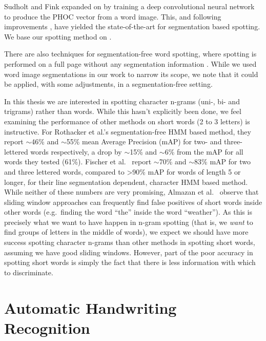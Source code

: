 \documentclass[ms,electronic,twosidetoc,letterpaper,chaptercenter,parttop,lof,lot]{byumsphd}
\begin{document}
Sudholt and Fink \cite{sudholt2016,sudholt2017} expanded on \cite{Almazan2014} by training a deep convolutional neural network to produce the PHOC vector from a word image. This, and following improvements \cite{krishnan2016, retsinasTrans2017}, have yielded the state-of-the-art for segmentation based spotting. We base our spotting method on \cite{sudholt2017}.

There are also techniques for segmentation-free word spotting, where spotting is performed on a full page without any segmentation information \cite{wilkinson2017}. While we used word image segmentations in our work to narrow its scope, we note that it could be applied, with some adjustments, in a segmentation-free setting.

In this thesis we are interested in spotting character n-grams (uni-, bi- and trigrams) rather than words. While this hasn't explicitly been done, we feel examining the performance of other methods on short words (2 to 3 letters) is instructive. For Rothacker et al.'s \cite{Rothacker2013} segmentation-free HMM based method, they report $\sim$46\% and $\sim$55\% mean Average Precision (mAP) for two- and three-lettered words respectively, a drop by $\sim$15\% and $\sim$6\% from the mAP for all words they tested (61\%). Fischer et al.~\cite{Fischer2012} report $\sim$70\% and $\sim$83\% mAP for two and three lettered words, compared to {\textgreater}90\% mAP for words of length 5 or longer, for their line segmentation dependent, character HMM based method. While neither of these numbers are very promising, Almazan et al.~\cite{Almazan2012} observe that sliding window approaches can frequently find false positives of short words inside other words (e.g.~finding the word ``the'' inside the word ``weather''). As this is precisely what we want to have happen in n-gram spotting (that is, we \textit{want} to find groups of letters in the middle of words), we expect we should have more success spotting character n-grams than other methods in spotting short words, assuming we have good sliding windows. However, part of the poor accuracy in spotting short words is simply the fact that there is less information with which to discriminate.%


\section{Automatic Handwriting Recognition}
\end{document}
